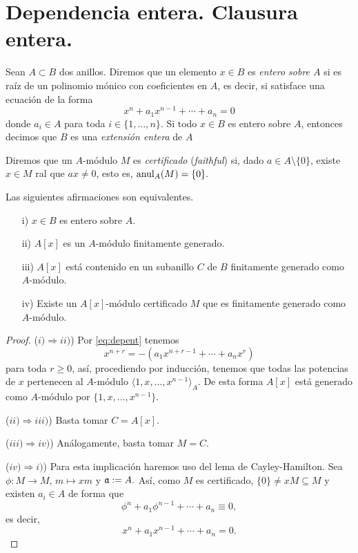 \documentclass[../main.tex]{subfiles}
\begin{document}
\section{Dependencia entera. Clausura entera.}
\begin{definition}
Sean $A\subset B$ dos anillos. Diremos que un elemento $x\in B$ es \textit{entero sobre $A$} si es raíz de un polinomio mónico con coeficientes en $A$, es decir, si satisface una ecuación de la forma
\begin{equation}\label{eq:depent}
    x^n+a_1x^{n-1}+\cdots+a_n=0
\end{equation}
donde $a_i\in A$ para toda $i\in\{1,\dots,n\}.$ Si todo $x\in B$ es entero sobre $A$, entonces decimos que $B$ es una \textit{extensión entera} de $A$
\end{definition}

\begin{definition}Diremos que un $A$-módulo $M$ es \textit{certificado} (\textit{faithful}) si, dado $a\in A\setminus\{0\}$, existe $x\in M$ ral que $ax\neq 0$, esto es, $\operatorname{anul}_A(M)=\{0\}.$
\end{definition}

\begin{proposition}\label{prop:entcarac}Las siguientes afirmaciones son equivalentes.
\begin{itemize}
    \item[i)] $x\in B$ es entero sobre $A.$
    \item[ii)] $A[x]$ es un $A$-módulo finitamente generado.
    \item[iii)] $A[x]$ está contenido en un subanillo $C$ de $B$ finitamente generado como $A$-módulo.
    \item[iv)] Existe un $A[x]$-módulo certificado $M$ que es finitamente generado como $A$-módulo.
\end{itemize}
\end{proposition}
\begin{proof}
($i)\Rightarrow ii)$) Por \ref{eq:depent} tenemos
$$x^{n+r}=-(a_1x^{n+r-1}+\cdots+a_nx^r)$$
para toda $r\ge 0$, así, procediendo por inducción, tenemos que todas las potencias de $x$ pertenecen al $A$-módulo $\langle 1,x,\dots,x^{n-1}\rangle_A.$ De esta forma $A[x]$ está generado como $A$-módulo por $\{1,x,\dots,x^{n-1}\}.$

($ii)\Rightarrow iii)$) Basta tomar $C=A[x].$

($iii)\Rightarrow iv)$) Análogamente, basta tomar $M=C.$

($iv)\Rightarrow i)$) Para esta implicación haremos uso del lema de Cayley-Hamilton. Sea $\phi:M\rightarrow M$, $m\mapsto xm$ y $\mathfrak{a}:= A.$ Así, como $M$ es certificado, $\{0\}\neq xM\subseteq M$ y existen $a_i\in A$ de forma que
$$\phi^n+a_1\phi^{n-1}+\cdots+a_n\equiv 0,$$
es decir,
$$x^n+a_1x^{n-1}+\cdots+a_n= 0.$$
\end{proof}
\end{document}
